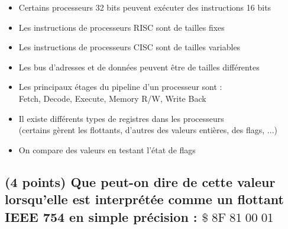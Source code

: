 \documentclass[11pt,a4paper]{article}
\begin{document}
\begin{itemize}
  \item[\checkmark] Certains processeurs 32 bits peuvent exécuter des instructions 16 bits \\
  \item[\checkmark] Les instructions de processeurs RISC sont de tailles fixes \\
  \item[\checkmark] Les instructions de processeurs CISC sont de tailles variables \\
  \item[\checkmark] Les bus d'adresses et de données peuvent être de tailles différentes \\
  \item[\checkmark] Les principaux étages du pipeline d'un processeur sont : \\
  Fetch, Decode, Execute, Memory R/W, Write Back \\
  \item[\checkmark] Il existe différents types de registres dans les processeurs \\
  (certains gèrent les flottants, d'autres des valeurs entières, des flags, ...) \\
  \item[\checkmark] On compare des valeurs en testant l'état de flags \\
\end{itemize}


\bigskip


\subsection{(4 points) Que peut-on dire de cette valeur lorsqu'elle est interprétée comme un flottant IEEE 754 en simple précision : $ \$ \; 8\text{F} \; 81 \; 00 \; 01 $ }
\end{document}
